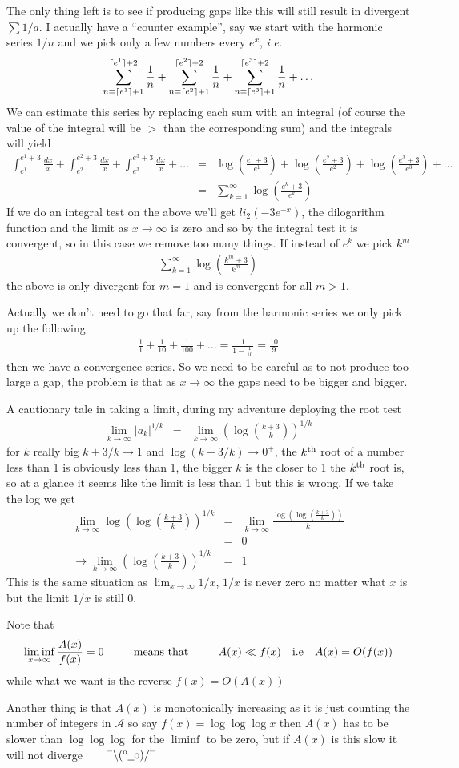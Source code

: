 \documentclass[aps,preprint,preprintnumbers,nofootinbib,showpacs,prd]{revtex4-1}
\newcommand{\ie}{{\it i.e.} }
\newcommand{\nbea}{\begin{eqnarray*}}
\newcommand{\neea}{\end{eqnarray*}}
\newcommand{\dunno}{$ {}^{\mbox {--}}\backslash(^{\rm o}{}\underline{\hspace{0.2cm}}{\rm o})/^{\mbox {--}}$}
\DeclarePairedDelimiter{\ceil}{\lceil}{\rceil}
\begin{document}
The only thing left is to see if producing gaps like this will still result in divergent $\sum 1/a$. I actually have a ``counter example'', say we start with the harmonic series $1/n$ and we pick only a few numbers every $e^x$, \ie 
%
\nbea
\sum_{n=\ceil{e^1}+1}^{\ceil{e^1}+2} \frac{1}{n} + \sum_{n=\ceil{e^2}+1}^{\ceil{e^2}+2} \frac{1}{n} + \sum_{n=\ceil{e^3}+1}^{\ceil{e^3}+2}\frac{1}{n} + \dots
\neea
%
We can estimate this series by replacing each sum with an integral (of course the value of the integral will be $>$ than the corresponding sum) and the integrals will yield
%
\nbea
\int_{e^1}^{e^1+3} \frac{dx}{x} + \int_{e^2}^{e^2+3} \frac{dx}{x} + \int_{e^3}^{e^3+3} \frac{dx}{x} + \dots & = & \log\left(\frac{e^1 + 3}{e^1}\right) + \log\left(\frac{e^2 + 3}{e^2}\right) + \log\left(\frac{e^3 + 3}{e^3}\right) + \dots \\
& = & \sum_{k = 1}^{\infty} \log \left(\frac{e^k+3}{e^k}\right)
\neea
%
If we do an integral test on the above we'll get ${{\mathit{li}}_{2}}\left(-3{{e}^{-x}}\right)$, the dilogarithm function and the limit as $x\to\infty$ is zero and so by the integral test it is convergent, so in this case we remove too many things. If instead of $e^k$ we pick $k^m$
%
\nbea
\sum_{k = 1}^{\infty} \log \left(\frac{k^{m}+3}{k^{m}}\right)
\neea
%
the above is only divergent for $m=1$ and is convergent for all $m > 1$.

Actually we don't need to go that far, say from the harmonic series we only pick up the following
%
\nbea
\frac{1}{1} + \frac{1}{10} + \frac{1}{100} + \dots = \frac{1}{1 - \frac{1}{10}} = \frac{10}{9}
\neea
%
then we have a convergence series. So we need to be careful as to not produce too large a gap, the problem is that as $x\to\infty$ the gaps need to be bigger and bigger.

A cautionary tale in taking a limit, during my adventure deploying the root test
%
\nbea
\lim_{k\to\infty} \left|a_k\right|^{1/k} & = & \lim_{k\to\infty} \left(\log\left(\frac{k+3}{k}\right)\right)^{1/k}
\neea 
%
for $k$ really big $k+3/k \to 1$ and $\log(k+3/k) \to 0^{+}$, the $k^{\rm th}$ root of a number less than 1 is obviously less than 1, the bigger $k$ is the closer to 1 the $k^{\rm th}$ root is, so at a glance it seems like the limit is less than 1 but this is wrong. If we take the log we get
%
\nbea
\lim_{k\to\infty} \log\left(\log\left(\frac{k+3}{k}\right)\right)^{1/k} & = & \lim_{k\to\infty} \frac{\log\left(\log\left(\frac{k+3}{k}\right)\right)}{k} \\
& = & 0 \\
\to \lim_{k\to\infty} \left(\log\left(\frac{k+3}{k}\right)\right)^{1/k} & = & 1
\neea
%
This is the same situation as $\lim_{x\to\infty} 1/x$, $1/x$ is never zero no matter what $x$ is but the limit $1/x$ is still 0.


Note that
%
\nbea
\liminf_{x\to\infty} \frac{A(x)}{f(x)} = 0 ~~~~~~~~ {\rm means~that} ~~~~~~~~ A(x) \ll f(x) ~~~{\rm i.e} ~~~ A(x) = O(f(x))
\neea
%
while what we want is the reverse $f(x) = O(A(x))$

Another thing is that $A(x)$ is monotonically increasing as it is just counting the number of integers in $\mathcal{A}$ so say $f(x) = \log\log\log x$ then $A(x)$ has to be slower than $\log\log\log$ for the $\liminf$ to be zero, but if $A(x)$ is this slow it will not diverge ~~~ \dunno
\end{document}
